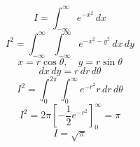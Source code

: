 \documentclass{article}
\begin{document}
\[
I=\int_{-\infty}^{\infty}e^{-x^2}\,dx
\]
\[
I^2=\int_{-\infty}^{\infty}\int_{-\infty}^{\infty}e^{-x^2-y^2}\,dx\,dy
\]
\[
x=r\cos\theta,\quad y=r\sin\theta
\]
\[
dx\,dy=r\,dr\,d\theta
\]
\[
I^2=\int_0^{2\pi}\int_0^{\infty}e^{-r^2}r\,dr\,d\theta
\]
\[
I^2=2\pi\left[-\frac{1}{2}e^{-r^2}\right]_0^{\infty}=\pi
\]
\[
I=\sqrt{\pi}
\]
\end{document}
